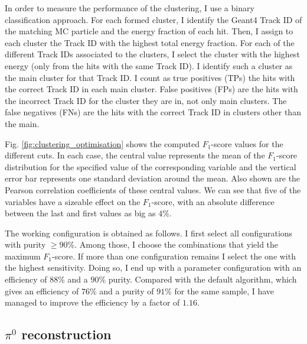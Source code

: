 In order to measure the performance of the clustering, I use a binary classification approach. For each formed cluster, I identify the Geant4 Track ID of the matching MC particle and the energy fraction of each hit. Then, I assign to each cluster the Track ID with the highest total energy fraction. For each of the different Track IDs associated to the clusters, I select the cluster with the highest energy (only from the hits with the same Track ID). I identify such a cluster as the main cluster for that Track ID. I count as true positives (TPs) the hits with the correct Track ID in each main cluster. False positives (FPs) are the hits with the incorrect Track ID for the cluster they are in, not only main clusters. The false negatives (FNs) are the hits with the correct Track ID in clusters other than the main.

Fig. \ref{fig:clustering_optimisation} shows the computed $F_{1}$-score values for the different cuts. In each case, the central value represents the mean of the $F_{1}$-score distribution for the specified value of the corresponding variable and the vertical error bar represents one standard deviation around the mean. Also shown are the Pearson correlation coefficients of these central values. We can see that five of the variables have a sizeable effect on the $F_{1}$-score, with an absolute difference between the last and first values as big as $4\%$.

The working configuration is obtained as follows. I first select all configurations with purity $\geq90\%$. Among those, I choose the combinations that yield the maximum $F_{1}$-score. If more than one configuration remains I select the one with the highest sensitivity. Doing so, I end up with a parameter configuration with an efficiency of $88\%$ and a $90\%$ purity. Compared with the default algorithm, which gives an efficiency of $76\%$ and a purity of $91\%$ for the same sample, I have managed to improve the efficiency by a factor of $1.16$.

\subsection[\texorpdfstring{$\pi^{0}$}{pi0} reconstruction]{\boldmath\texorpdfstring{$\pi^{0}$}{pi0} reconstruction}

